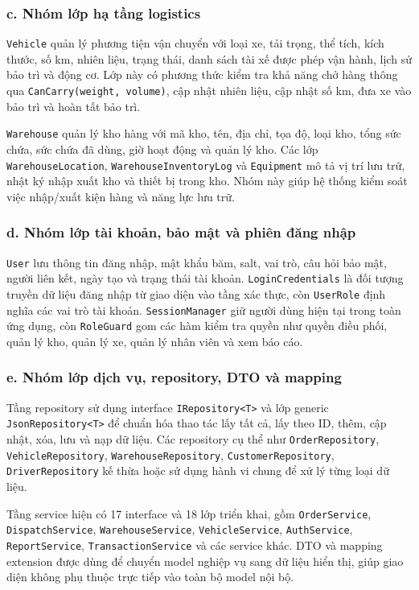 \documentclass[12pt,a4paper]{article}
\begin{document}
\subsubsection*{c. Nhóm lớp hạ tầng logistics}

\texttt{Vehicle} quản lý phương tiện vận chuyển với loại xe, tải trọng, thể tích, kích thước, số km, nhiên liệu, trạng thái, danh sách tài xế được phép vận hành, lịch sử bảo trì và động cơ. Lớp này có phương thức kiểm tra khả năng chở hàng thông qua \texttt{CanCarry(weight, volume)}, cập nhật nhiên liệu, cập nhật số km, đưa xe vào bảo trì và hoàn tất bảo trì.

\texttt{Warehouse} quản lý kho hàng với mã kho, tên, địa chỉ, tọa độ, loại kho, tổng sức chứa, sức chứa đã dùng, giờ hoạt động và quản lý kho. Các lớp \texttt{WarehouseLocation}, \texttt{WarehouseInventoryLog} và \texttt{Equipment} mô tả vị trí lưu trữ, nhật ký nhập xuất kho và thiết bị trong kho. Nhóm này giúp hệ thống kiểm soát việc nhập/xuất kiện hàng và năng lực lưu trữ.

\subsubsection*{d. Nhóm lớp tài khoản, bảo mật và phiên đăng nhập}

\texttt{User} lưu thông tin đăng nhập, mật khẩu băm, salt, vai trò, câu hỏi bảo mật, người liên kết, ngày tạo và trạng thái tài khoản. \texttt{LoginCredentials} là đối tượng truyền dữ liệu đăng nhập từ giao diện vào tầng xác thực, còn \texttt{UserRole} định nghĩa các vai trò tài khoản. \texttt{SessionManager} giữ người dùng hiện tại trong toàn ứng dụng, còn \texttt{RoleGuard} gom các hàm kiểm tra quyền như quyền điều phối, quản lý kho, quản lý xe, quản lý nhân viên và xem báo cáo.

\subsubsection*{e. Nhóm lớp dịch vụ, repository, DTO và mapping}

Tầng repository sử dụng interface \texttt{IRepository<T>} và lớp generic \texttt{JsonRepository<T>} để chuẩn hóa thao tác lấy tất cả, lấy theo ID, thêm, cập nhật, xóa, lưu và nạp dữ liệu. Các repository cụ thể như \texttt{OrderRepository}, \texttt{VehicleRepository}, \texttt{WarehouseRepository}, \texttt{CustomerRepository}, \texttt{DriverRepository} kế thừa hoặc sử dụng hành vi chung để xử lý từng loại dữ liệu.

Tầng service hiện có 17 interface và 18 lớp triển khai, gồm \texttt{OrderService}, \texttt{DispatchService}, \texttt{WarehouseService}, \texttt{VehicleService}, \texttt{AuthService}, \texttt{ReportService}, \texttt{TransactionService} và các service khác. DTO và mapping extension được dùng để chuyển model nghiệp vụ sang dữ liệu hiển thị, giúp giao diện không phụ thuộc trực tiếp vào toàn bộ model nội bộ.
\end{document}
